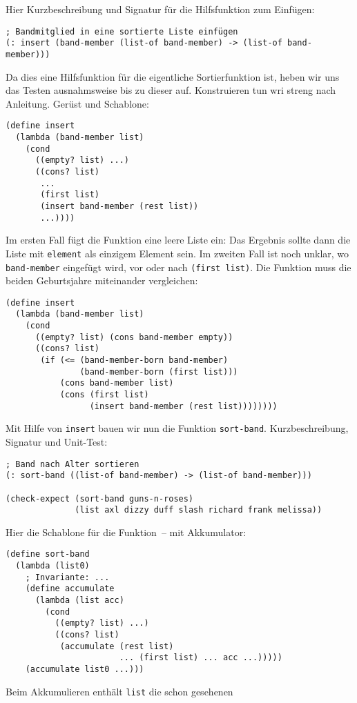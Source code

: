 Hier Kurzbeschreibung und Signatur für die Hilfsfunktion zum Einfügen:
%
\begin{lstlisting}
; Bandmitglied in eine sortierte Liste einfügen
(: insert (band-member (list-of band-member) -> (list-of band-member)))
\end{lstlisting}
%
Da dies eine Hilfsfunktion für die eigentliche Sortierfunktion ist,
heben wir uns das Testen ausnahmsweise bis zu dieser auf.
Konstruieren tun wri streng nach Anleitung.  Gerüst und Schablone:
%
\begin{lstlisting}
(define insert
  (lambda (band-member list)
    (cond
      ((empty? list) ...)
      ((cons? list)
       ...
       (first list)
       (insert band-member (rest list))
       ...))))
\end{lstlisting}
%
Im ersten Fall fügt die Funktion eine leere Liste ein: Das Ergebnis
sollte dann die Liste mit \lstinline{element} als einzigem Element
sein.  Im zweiten Fall ist noch unklar, wo \lstinline{band-member}
eingefügt wird, vor oder nach \lstinline{(first list)}.  Die Funktion
muss die beiden Geburtsjahre miteinander vergleichen:
%
\begin{lstlisting}
(define insert
  (lambda (band-member list)
    (cond
      ((empty? list) (cons band-member empty))
      ((cons? list)
       (if (<= (band-member-born band-member)
               (band-member-born (first list)))
           (cons band-member list)
           (cons (first list)
                 (insert band-member (rest list))))))))
\end{lstlisting}
%
Mit Hilfe von \lstinline{insert} bauen wir nun die Funktion
\lstinline{sort-band}.  Kurzbeschreibung, Signatur und Unit-Test:
%
\begin{lstlisting}
; Band nach Alter sortieren
(: sort-band ((list-of band-member) -> (list-of band-member)))

(check-expect (sort-band guns-n-roses)
              (list axl dizzy duff slash richard frank melissa))
\end{lstlisting}
%
Hier die Schablone für die Funktion~-- mit Akkumulator:
%
\begin{lstlisting}
(define sort-band
  (lambda (list0)
    ; Invariante: ...
    (define accumulate     
      (lambda (list acc)
        (cond
          ((empty? list) ...)
          ((cons? list)
           (accumulate (rest list)
                       ... (first list) ... acc ...)))))
    (accumulate list0 ...)))
\end{lstlisting}
%
Beim Akkumulieren enthält \lstinline{list} die schon gesehenen
